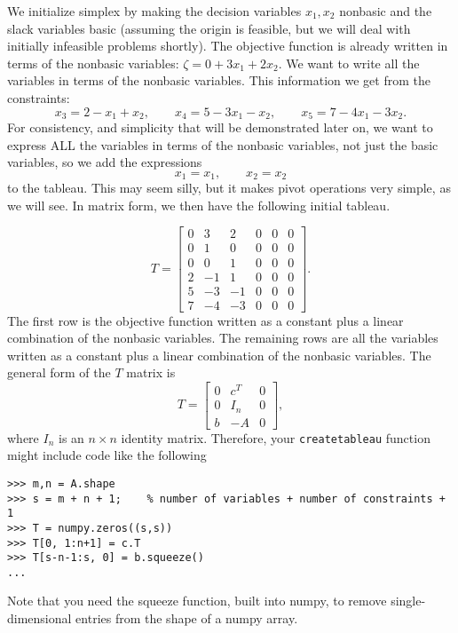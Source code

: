 We initialize simplex by making the decision variables $x_1, x_2$ nonbasic and the slack variables basic (assuming the origin is feasible, but we will deal with initially infeasible problems shortly).
The objective function is already written in terms of the nonbasic variables: $\zeta = 0 + 3x_1 + 2x_2$.
We want to write all the variables in terms of the nonbasic variables. This information we get from the constraints:
\[ x_3 = 2 - x_1 + x_2, \qquad x_4 = 5 - 3x_1 - x_2, \qquad x_5 = 7 - 4x_1 - 3x_2. \]
For consistency, and simplicity that will be demonstrated later on, we want to express ALL the variables in terms of the nonbasic variables, not just the basic variables, so we add the expressions
\[ x_1 = x_1, \qquad x_2 = x_2 \]
to the tableau.
This may seem silly, but it makes pivot operations very simple, as we will see.
In matrix form, we then have the following initial tableau.

\[
	T = \begin{bmatrix}
		0 & 3 & 2 & 0 & 0 & 0 \\
		0 & 1 & 0 & 0 & 0 & 0 \\
		0 & 0 & 1 & 0 & 0 & 0 \\
		2 &-1 & 1 & 0 & 0 & 0 \\
		5 &-3 &-1 & 0 & 0 & 0 \\
		7 &-4 &-3 & 0 & 0 & 0
	\end{bmatrix}.
\]
The first row is the objective function written as a constant plus a linear combination of the nonbasic variables.
The remaining rows are all the variables written as a constant plus a linear combination of the nonbasic variables.
The general form of the $T$ matrix is
\[ T = \begin{bmatrix}
    0 & c^T   & 0 \\
    0 & I_n & 0 \\
    b & -A  & 0
\end{bmatrix}, \]
where $I_n$ is an $n \times n$ identity matrix.
Therefore, your {\tt createtableau} function might include code like the following

\begin{lstlisting}
>>> m,n = A.shape
>>> s = m + n + 1;    % number of variables + number of constraints + 1
>>> T = numpy.zeros((s,s))
>>> T[0, 1:n+1] = c.T
>>> T[s-n-1:s, 0] = b.squeeze()
...
\end{lstlisting}

Note that you need the squeeze function, built into numpy, to remove single-dimensional entries from the shape of a numpy array. 

